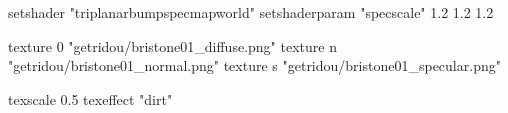 setshader "triplanarbumpspecmapworld"
setshaderparam "specscale" 1.2 1.2 1.2

   texture 0 "getridou/bristone01_diffuse.png"
   texture n "getridou/bristone01_normal.png"
   texture s "getridou/bristone01_specular.png"

texscale 0.5
texeffect "dirt"
